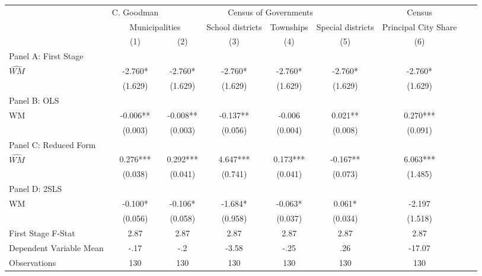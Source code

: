  \begin{tabular}{l*{8}{c}} \toprule
&\multicolumn{1}{c}{C. Goodman}&\multicolumn{4}{c}{Census of Governments}&\multicolumn{1}{c}{Census}\\\cmidrule(lr){2-2}\cmidrule(lr){3-6}\cmidrule(lr){7-7}
&\multicolumn{2}{c}{Municipalities}&\multicolumn{1}{c}{School districts}&\multicolumn{1}{c}{Townships}&\multicolumn{1}{c}{Special districts}&\multicolumn{1}{c}{Principal City Share}\\\cmidrule(lr){2-3}\cmidrule(lr){4-6}\cmidrule(lr){7-7}
&\multicolumn{1}{c}{(1)}&\multicolumn{1}{c}{(2)}&\multicolumn{1}{c}{(3)}&\multicolumn{1}{c}{(4)}&\multicolumn{1}{c}{(5)}&\multicolumn{1}{c}{(6)}\\
\cmidrule(lr){1-7}
\multicolumn{6}{l}{Panel A: First Stage}\\
\cmidrule(lr){1-7}
$\widehat{WM}$  &   -2.760*  &   -2.760*  &   -2.760*  &   -2.760*  &   -2.760*  &   -2.760*  \\
                &  (1.629)   &  (1.629)   &  (1.629)   &  (1.629)   &  (1.629)   &  (1.629)   \\
\cmidrule(lr){1-7}
\multicolumn{6}{l}{Panel B: OLS}\\
\cmidrule(lr){1-7}
WM              &   -0.006** &   -0.008** &   -0.137** &   -0.006   &    0.021** &    0.270***\\
                &  (0.003)   &  (0.003)   &  (0.056)   &  (0.004)   &  (0.008)   &  (0.091)   \\
\cmidrule(lr){1-7}
\multicolumn{6}{l}{Panel C: Reduced Form}\\
\cmidrule(lr){1-7}
$\widehat{WM}$  &    0.276***&    0.292***&    4.647***&    0.173***&   -0.167** &    6.063***\\
                &  (0.038)   &  (0.041)   &  (0.741)   &  (0.041)   &  (0.073)   &  (1.485)   \\
\cmidrule(lr){1-7}
\multicolumn{6}{l}{Panel D: 2SLS}\\
\cmidrule(lr){1-7}
WM              &   -0.100*  &   -0.106*  &   -1.684*  &   -0.063*  &    0.061*  &   -2.197   \\
                &  (0.056)   &  (0.058)   &  (0.958)   &  (0.037)   &  (0.034)   &  (1.518)   \\
\midrule
First Stage F-Stat&     2.87   &     2.87   &     2.87   &     2.87   &     2.87   &     2.87   \\
Dependent Variable Mean&     -.17   &      -.2   &    -3.58   &     -.25   &      .26   &   -17.07   \\
Observations    &      130   &      130   &      130   &      130   &      130   &      130   \\
       \bottomrule \end{tabular}
